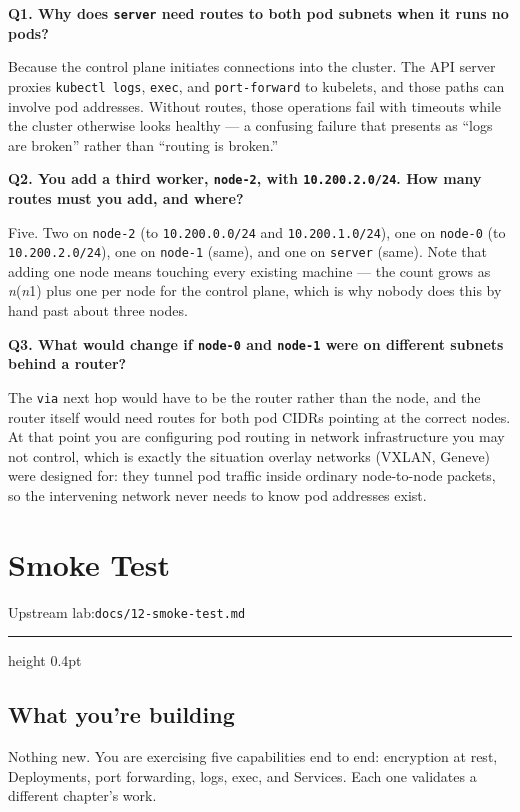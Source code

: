 \documentclass[11pt,oneside]{report}
\newcommand{\upstreamlab}[1]{%
  {\sffamily\footnotesize\color{steel}Upstream lab:\quad\texttt{#1}}\par\vspace{2pt}%
  {\color{rule}\hrule height 0.4pt}\vspace{8pt}}
\begin{document}
\textbf{Q1. Why does
\texttt{server} need
routes to both pod
subnets when it runs
no pods?}

Because the control
plane initiates
connections into the
cluster. The API
server proxies
\texttt{kubectl\ logs},
\texttt{exec}, and
\texttt{port-forward}
to kubelets, and
those paths can
involve pod
addresses. Without
routes, those
operations fail with
timeouts while the
cluster otherwise
looks healthy --- a
confusing failure
that presents as
``logs are broken''
rather than
``routing is
broken.''

\textbf{Q2. You add
a third worker,
\texttt{node-2},
with
\texttt{10.200.2.0/24}.
How many routes must
you add, and where?}

Five. Two on
\texttt{node-2} (to
\texttt{10.200.0.0/24}
and
\texttt{10.200.1.0/24}),
one on
\texttt{node-0} (to
\texttt{10.200.2.0/24}),
one on
\texttt{node-1}
(same), and one on
\texttt{server}
(same). Note that
adding one node
means touching every
existing machine ---
the count grows as
\emph{n}(\emph{n}\textminus{}1)
plus one per node
for the control
plane, which is why
nobody does this by
hand past about
three nodes.

\textbf{Q3. What
would change if
\texttt{node-0} and
\texttt{node-1} were
on different subnets
behind a router?}

The \texttt{via}
next hop would have
to be the router
rather than the
node, and the router
itself would need
routes for both pod
CIDRs pointing at
the correct nodes.
At that point you
are configuring pod
routing in network
infrastructure you
may not control,
which is exactly the
situation overlay
networks (VXLAN,
Geneve) were
designed for: they
tunnel pod traffic
inside ordinary
node-to-node
packets, so the
intervening network
never needs to know
pod addresses exist.

\hypertarget{chap-12}{%
\chapter{Smoke
Test}\label{chap-12}}

\upstreamlab{docs/12-smoke-test.md}

\hypertarget{what-youre-building-12}{%
\section{What you're
building}\label{what-youre-building-12}}

Nothing new. You are
exercising five
capabilities end to
end: encryption at
rest, Deployments,
port forwarding,
logs, exec, and
Services. Each one
validates a
different chapter's
work.
\end{document}
